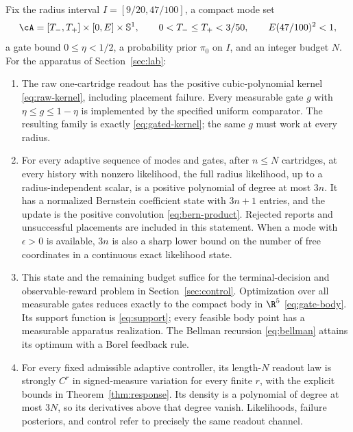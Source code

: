 \begin{theorem}\label{thm:main}
Fix the radius interval $I=[9/20,47/100]$, a compact mode set
\[
 \cA=[T_-,T_+]\times[0,E]\times\mathbb S^1,
 \qquad 0<T_-\le T_+<3/50,\qquad E(47/100)^2<1,
\]
a gate bound $0\le\eta<1/2$, a probability prior $\pi_0$ on $I$, and an
integer budget $N$. For the apparatus of Section~\ref{sec:lab}:
\begin{enumerate}
\item The raw one-cartridge readout has the positive cubic-polynomial
kernel \eqref{eq:raw-kernel}, including placement failure. Every measurable
gate $g$ with $\eta\le g\le1-\eta$ is implemented by the specified uniform
comparator. The resulting family is exactly \eqref{eq:gated-kernel}; the
same $g$ must work at every radius.
\item For every adaptive sequence of modes and gates, after $n\le N$
cartridges, at every history with nonzero likelihood, the full radius
likelihood, up to a radius-independent scalar,
is a positive polynomial of degree at most $3n$. It has a normalized
Bernstein coefficient state with $3n+1$ entries, and the update is the
positive convolution \eqref{eq:bern-product}. Rejected reports and
unsuccessful placements are included in this statement. When a mode with
$\epsilon>0$ is available, $3n$ is also a sharp lower bound on the number
of free coordinates in a continuous exact likelihood state.
\item This state and the remaining budget suffice for the terminal-decision
and observable-reward problem in Section~\ref{sec:control}. Optimization over
all measurable gates reduces exactly to the compact body in $\R^5$
\eqref{eq:gate-body}. Its support function is \eqref{eq:support}; every
feasible body point has a measurable apparatus realization. The Bellman
recursion \eqref{eq:bellman} attains its optimum with a Borel feedback rule.
\item For every fixed admissible adaptive controller, its length-$N$
readout law is strongly $C^r$ in signed-measure variation for every finite
$r$, with the explicit bounds in Theorem~\ref{thm:response}. Its density is
a polynomial of degree at most $3N$, so its derivatives above that degree
vanish. Likelihoods, failure posteriors, and control refer to precisely the
same readout channel.
\end{enumerate}
\end{theorem}
